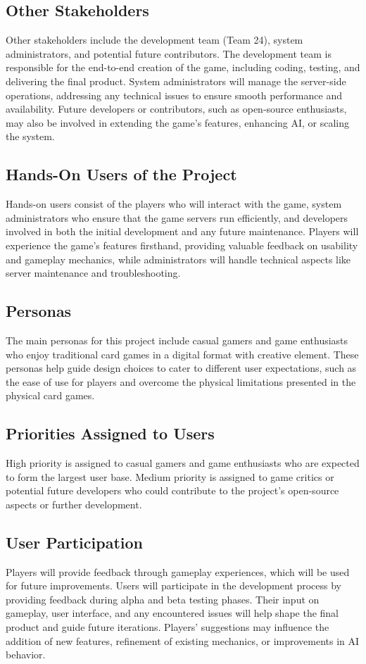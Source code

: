 \documentclass{article}
\begin{document}
\subsection{Other Stakeholders}
Other stakeholders include the development team (Team 24), system administrators, and potential future contributors. The development team is responsible for the end-to-end creation of the game, including coding, testing, and delivering the final product. System administrators will manage the server-side operations, addressing any technical issues to ensure smooth performance and availability. Future developers or contributors, such as open-source enthusiasts, may also be involved in extending the game’s features, enhancing AI, or scaling the system.

\subsection{Hands-On Users of the Project}
Hands-on users consist of the players who will interact with the game, system administrators who ensure that the game servers run efficiently, and developers involved in both the initial development and any future maintenance. Players will experience the game's features firsthand, providing valuable feedback on usability and gameplay mechanics, while administrators will handle technical aspects like server maintenance and troubleshooting.

\subsection{Personas}
The main personas for this project include casual gamers and game enthusiasts who enjoy traditional card games in a digital format with creative element. These personas help guide design choices to cater to different user expectations, such as the ease of use for players and overcome the physical limitations presented in the physical card games.

\subsection{Priorities Assigned to Users}
High priority is assigned to casual gamers and game enthusiasts who are expected to form the largest user base. Medium priority is assigned to game critics or potential future developers who could contribute to the project’s open-source aspects or further development.

\subsection{User Participation}
Players will provide feedback through gameplay experiences, which will be used for future improvements. Users will participate in the development process by providing feedback during alpha and beta testing phases. Their input on gameplay, user interface, and any encountered issues will help shape the final product and guide future iterations. Players’ suggestions may influence the addition of new features, refinement of existing mechanics, or improvements in AI behavior.
\end{document}
